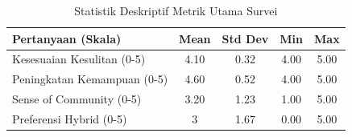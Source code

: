 \begin{table}[!ht]
\centering
\caption{Statistik Deskriptif Metrik Utama Survei}
\label{tab:stats_deskriptif}
\begin{tabular}{l|c|c|c|c}
\hline
\textbf{Pertanyaan (Skala)} & \textbf{Mean} & \textbf{Std Dev} & \textbf{Min} & \textbf{Max} \\ \hline
Kesesuaian Kesulitan (0-5) & 4.10 & 0.32 & 4.00 & 5.00 \\
Peningkatan Kemampuan (0-5) & 4.60 & 0.52 & 4.00 & 5.00 \\
Sense of Community (0-5) & 3.20 & 1.23 & 1.00 & 5.00 \\
Preferensi Hybrid (0-5) & 3 & 1.67 & 0.00 & 5.00 \\ \hline
\end{tabular}
\end{table}
